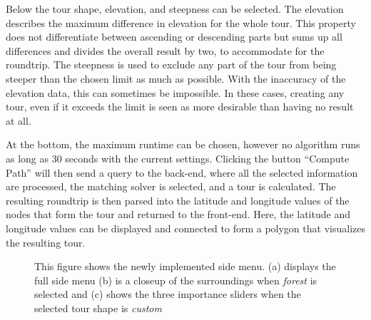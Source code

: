 Below the tour shape, elevation, and steepness can be selected. 
The elevation describes the maximum difference in elevation for the whole tour. 
This property does not differentiate between ascending or descending parts but sums up all differences and divides the overall result by two, to accommodate for the roundtrip. 
The steepness is used to exclude any part of the tour from being steeper than the chosen limit as much as possible.
With the inaccuracy of the elevation data, this can sometimes be impossible.
In these cases, creating any tour, even if it exceeds the limit is seen as more desirable than having no result at all.

At the bottom, the maximum runtime can be chosen, however no algorithm runs as long as 30 seconds with the current settings.
Clicking the button \enquote{Compute Path} will then send a query to the back-end, where all the selected information are processed, the matching solver is selected, and a tour is calculated.
The resulting roundtrip is then parsed into the latitude and longitude values of the nodes that form the tour and returned to the front-end.
Here, the latitude and longitude values can be displayed and connected to form a polygon that visualizes the resulting tour.

\begin{figure}[H]
	\centering
	\usebox{\measurebox}\qquad\hfill
	\begin{minipage}[b][\ht\measurebox][s]{.5\textwidth}
		\centering
		
		\vfill
		
	\end{minipage}
	\caption{This figure shows the newly implemented side menu. (a) displays the full side menu (b) is a closeup of the surroundings when \textit{forest} is selected and (c) shows the three importance sliders when the selected tour shape is \textit{custom}}
	\label{fig:actualFrontendSideMenu}
\end{figure}

